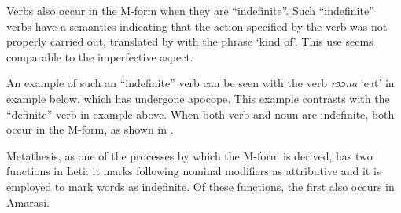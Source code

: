 \begin{exe}\let\eachwordone=\it
\end{exe}

Verbs also occur in the M-form when they are ``indefinite''.
Such ``indefinite'' verbs have a semantics indicating that
the action specified by the verb was not properly carried out,
translated by \citeauthor{en96} with the phrase `kind of'.
This use seems comparable to the imperfective aspect.

An example of such an ``indefinite'' verb can be seen with the verb \emph{rɔɔna} `eat'
in example  below, which has undergone apocope.
This example contrasts with the ``definite'' verb in example  above.
When both verb and noun are indefinite,
both occur in the M-form,
as shown in .

\begin{exe}\let\eachwordone=\it
\end{exe}
	
Metathesis, as one of the processes by which the M-form is derived,
has two functions in Leti:
it marks following nominal modifiers as attributive 
and it is employed to mark words as indefinite.
Of these functions, the first also occurs in Amarasi.